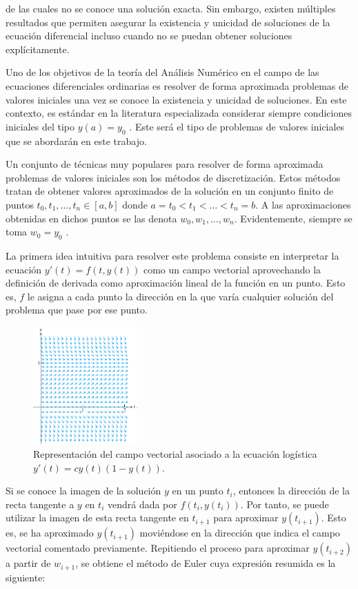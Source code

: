 \documentclass{article}
\theoremstyle{theorem-style}  %
\theoremstyle{definition-style}
\theoremstyle{example-style}
\begin{document}
	de las cuales no se conoce una solución exacta. Sin embargo, existen múltiples resultados que permiten asegurar la existencia y unicidad de soluciones de la ecuación diferencial incluso cuando no se puedan obtener soluciones explícitamente.

	Uno de los objetivos de la teoría del Análisis Numérico en el campo de las ecuaciones diferenciales ordinarias es resolver de forma aproximada problemas de valores iniciales una vez se conoce la existencia y unicidad de soluciones. En este contexto, es estándar en la literatura especializada considerar siempre condiciones iniciales del tipo $y(a) = y_0$ \cite{sauer}. Este será el tipo de problemas de valores iniciales que se abordarán en este trabajo.

	Un conjunto de técnicas muy populares para resolver de forma aproximada problemas de valores iniciales son los métodos de discretización. Estos métodos tratan de obtener valores aproximados de la solución en un conjunto finito de puntos $t_0, t_1, \ldots, t_n \in [a,b]$ donde $a = t_0 < t_1 < \ldots < t_n = b$. A las aproximaciones obtenidas en dichos puntos se las denota $w_0, w_1, \ldots, w_n$. Evidentemente, siempre se toma $w_0 = y_0$ \cite{gasca}.

	La primera idea intuitiva para resolver este problema consiste en interpretar la ecuación $y'(t) = f(t,y(t))$ como un campo vectorial aprovechando la definición de derivada como aproximación lineal de la función en un punto. Esto es, $f$ le asigna a cada punto la dirección en la que varía cualquier solución del problema que pase por ese punto.

	\begin{figure}[h]
		\centering
		\includegraphics[width=4cm]{./Images/interpret-pvi.png}
		\caption{Representación del campo vectorial asociado a la ecuación logística $y'(t) = c y(t) (1 - y(t))$.}
		\label{fig:interpret-pvi}
	\end{figure}

	Si se conoce la imagen de la solución $y$ en un punto $t_{i}$, entonces la dirección de la recta tangente a $y$ en $t_{i}$ vendrá dada por $f(t_i,y(t_i))$. Por tanto, se puede utilizar la imagen de esta recta tangente en $t_{i+1}$ para aproximar $y(t_{i+1})$. Esto es, se ha aproximado $y(t_{i+1})$ moviéndose en la dirección que indica el campo vectorial comentado previamente. Repitiendo el proceso para aproximar $y(t_{i+2})$ a partir de $w_{i+1}$, se obtiene el método de Euler cuya expresión resumida es la siguiente:
\end{document}
